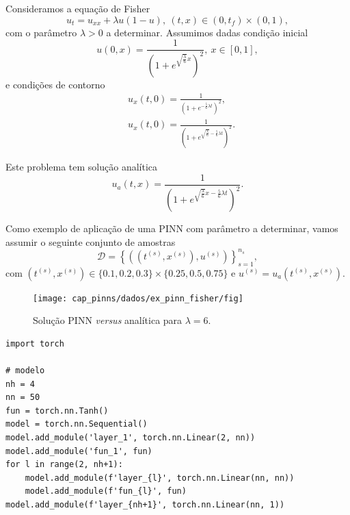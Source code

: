 \begin{ex}\label{cap_pinns_sec_param:ex:fisher}
  Consideramos a equação de Fisher{\fisher}
  \begin{equation}
    u_t = u_{xx} + \lambda u(1-u), ~(t,x)\in(0,t_f)\times(0,1),
  \end{equation}
  com o parâmetro $\lambda>0$ a determinar. Assumimos dadas condição inicial
  \begin{equation}
    u(0,x) = \frac{1}{\left(1+e^{\sqrt{\frac{\lambda}{6}}x}\right)^2}, ~x\in[0,1],
  \end{equation}
  e condições de contorno
  \begin{align}
    &u_x(t,0) = \frac{1}{\left(1+e^{-\frac{5}{6}\lambda t}\right)^2},\\
    &u_x(t,0) = \frac{1}{\left(1+e^{\sqrt{\frac{\lambda}{6}}-\frac{5}{6}\lambda t}\right)^2}.
  \end{align}
  
  Este problema tem solução analítica \cite{Agirseven2010a}
  \begin{equation}
    u_a(t,x) = \frac{1}{\left(1+e^{\sqrt{\frac{\lambda}{6}}x-\frac{5}{6}\lambda t}\right)^2}.
  \end{equation}

  Como exemplo de aplicação de uma PINN com parâmetro a determinar, vamos assumir o seguinte conjunto de amostras
  \begin{equation}
    \mathcal{D} = \left\{\left(\left(t^{(s)},x^{(s)}\right),u^{(s)}\right)\right\}_{s=1}^{n_s},
  \end{equation}
  com $\left(t^{(s)},x^{(s)}\right)\in\{0.1, 0.2, 0.3\}\times\{0.25,0.5,0.75\}$ e $u^{(s)} = u_a\left(t^{(s)},x^{(s)}\right)$.

  \begin{figure}[H]
    \centering
    \texttt{[image: cap\_pinns/dados/ex\_pinn\_fisher/fig]}
    \caption{Solução PINN \textit{versus} analítica para $\lambda = 6$.}
  \end{figure}

\begin{lstlisting}[caption=ex\_pinn\_fisher.py]
import torch

# modelo
nh = 4
nn = 50
fun = torch.nn.Tanh()
model = torch.nn.Sequential()
model.add_module('layer_1', torch.nn.Linear(2, nn))
model.add_module('fun_1', fun)
for l in range(2, nh+1):
    model.add_module(f'layer_{l}', torch.nn.Linear(nn, nn))
    model.add_module(f'fun_{l}', fun)
model.add_module(f'layer_{nh+1}', torch.nn.Linear(nn, 1))


\end{lstlisting}
\end{ex}
